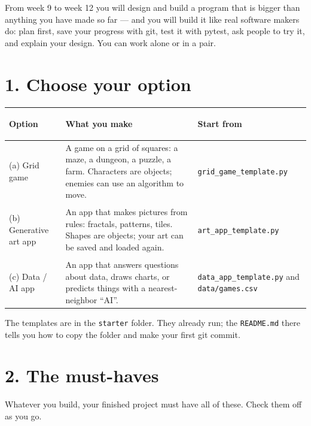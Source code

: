 \documentclass[level=3]{kidscode}
\begin{document}
\namedateline

\begin{tip}
From week 9 to week 12 you will design and build a program that is bigger than anything you have
made so far --- and you will build it like real software makers do: plan first, save your
progress with git, test it with pytest, ask people to try it, and explain your design. You can
work alone or in a pair.
\end{tip}

\section{1. Choose your option}

\renewcommand{\arraystretch}{1.3}
\begin{tabularx}{\linewidth}{@{}>{\bfseries\raggedright\arraybackslash}p{3.1cm}X>{\raggedright\arraybackslash}p{3.6cm}@{}}
\toprule
\rowcolor{kcaccent!15} Option & What you make & Start from\\ \midrule
(a) Grid game & A game on a grid of squares: a maze, a dungeon, a puzzle, a farm. Characters are
objects; enemies can use an algorithm to move. & \texttt{grid\_game\_template.py}\\ \midrule
(b) Generative art app & An app that makes pictures from rules: fractals, patterns, tiles. Shapes
are objects; your art can be saved and loaded again. & \texttt{art\_app\_template.py}\\ \midrule
(c) Data / AI app & An app that answers questions about data, draws charts, or predicts things
with a nearest-neighbor \enquote{AI}. & \texttt{data\_app\_template.py} and \texttt{data/games.csv}\\
\bottomrule
\end{tabularx}

The templates are in the \texttt{starter} folder. They already run; the \texttt{README.md} there
tells you how to copy the folder and make your first git commit.

\section{2. The must-haves}

Whatever you build, your finished project must have all of these. Check them off as you go.
\end{document}
